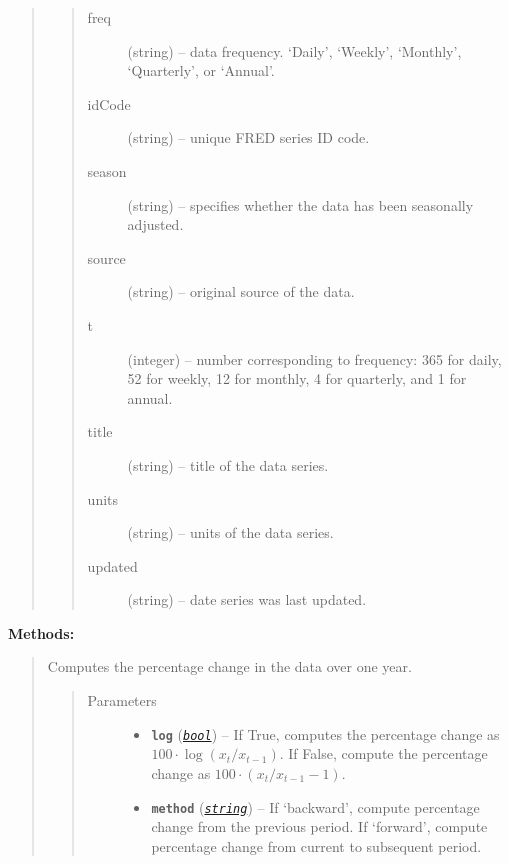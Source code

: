 \documentclass[letterpaper,10pt,english]{sphinxmanual}
\begin{document}
\begin{fulllineitems}
\begin{quote}
\begin{quote}
\begin{description}
\item[{freq}] \leavevmode
(string) -- data frequency. `Daily', `Weekly', `Monthly', `Quarterly', or `Annual'.

\item[{idCode}] \leavevmode
(string) -- unique FRED series ID code.

\item[{season}] \leavevmode
(string) -- specifies whether the data has been seasonally adjusted.

\item[{source}] \leavevmode
(string) -- original source of the data.

\item[{t}] \leavevmode
(integer) -- number corresponding to frequency: 365 for daily, 52 for weekly, 12 for monthly, 4 for quarterly, and 1 for annual.

\item[{title}] \leavevmode
(string) -- title of the data series.

\item[{units}] \leavevmode
(string) -- units of the data series.

\item[{updated}] \leavevmode
(string) -- date series was last updated.

\end{description}\end{quote}
\end{quote}

\textbf{Methods:}
\begin{quote}

\begin{fulllineitems}
\label{series_class:fredpy.series.apc}
Computes the percentage change in the data over one year.
\begin{quote}\begin{description}
\item[{Parameters}] \leavevmode\begin{itemize}
\item {} 
\textbf{\texttt{log}} (\href{https://docs.python.org/2/library/functions.html\#bool}{\emph{\texttt{bool}}}) -- If True, computes the percentage change as \(100\cdot\log(x_{t}/x_{t-1})\). If False, compute the percentage change as \(100\cdot\left( x_{t}/x_{t-1} - 1\right)\).

\item {} 
\textbf{\texttt{method}} (\href{https://docs.python.org/2/library/string.html\#module-string}{\emph{\texttt{string}}}) -- If `backward', compute percentage change from the previous period. If `forward', compute percentage change from current to subsequent period.


\end{itemize}
\end{description}
\end{quote}
\end{fulllineitems}
\end{quote}
\end{fulllineitems}
\end{document}
